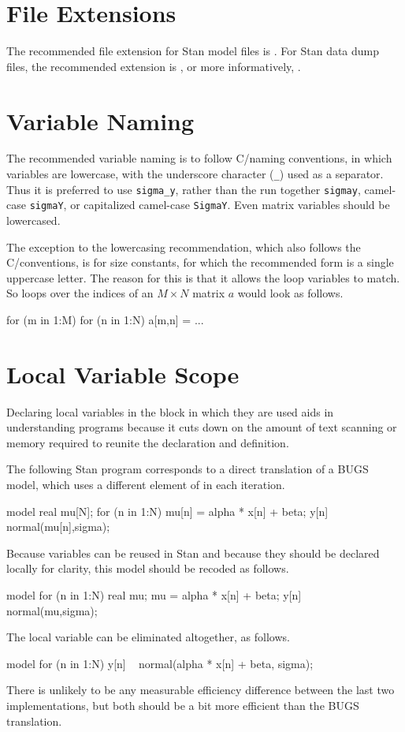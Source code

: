 \section{File Extensions}

The recommended file extension for Stan model files is .  
For Stan data dump files, the recommended extension is , or
more informatively, .

\section{Variable Naming}

The recommended variable naming is to follow C/\Cpp naming
conventions, in which variables are lowercase, with the underscore
character (\Verb|_|) used as a separator.  Thus it is preferred to use
\Verb|sigma_y|, rather than the run together \Verb|sigmay|, camel-case
\Verb|sigmaY|, or capitalized camel-case \Verb|SigmaY|.  Even matrix
variables should be lowercased.

The exception to the lowercasing recommendation, which also follows
the C/\Cpp conventions, is for size constants, for which the
recommended form is a single uppercase letter.  The reason for this is
that it allows the loop variables to match.  So loops over the indices of
an $M \times N$ matrix $a$ would look as follows.
%
\begin{stancode}
for (m in 1:M)
  for (n in 1:N)
     a[m,n] = ...
\end{stancode}


\section{Local Variable Scope}

Declaring local variables in the block in which they are used aids in
understanding programs because it cuts down on the amount of text
scanning or memory required to reunite the declaration and definition.

The following Stan program corresponds to a direct translation of a
BUGS model, which uses a different element of  in each
iteration.
%
\begin{stancode}
model {
  real mu[N];
  for (n in 1:N) {
    mu[n] = alpha * x[n] + beta;
    y[n] ~ normal(mu[n],sigma);
  }
}
\end{stancode}
%
Because variables can be reused in Stan and because they should be
declared locally for clarity, this model should be recoded as follows.
%
\begin{stancode}
model {
  for (n in 1:N) {
    real mu;
    mu = alpha * x[n] + beta;
    y[n] ~ normal(mu,sigma);
  }
}
\end{stancode}
% 
The local variable can be eliminated altogether, as follows.
%
\begin{stancode}
model {
  for (n in 1:N)
    y[n] ~ normal(alpha * x[n] + beta, sigma);
}
\end{stancode}
%
There is unlikely to be any measurable efficiency difference
between the last two implementations, but both should be a bit
more efficient than the BUGS translation.

